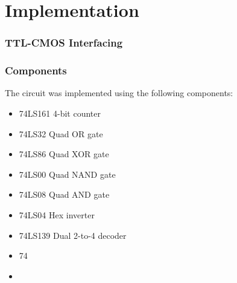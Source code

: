 \documentclass{article}
\begin{document}
        
    \section{Implementation}  
        \subsubsection{TTL-CMOS Interfacing}

        
    

        \subsubsection{Components}
        The circuit was implemented using the following components:
        \begin{itemize}
            \item 74LS161 4-bit counter
            \item 74LS32 Quad OR gate
            \item 74LS86 Quad XOR gate
            \item 74LS00 Quad NAND gate
            \item 74LS08 Quad AND gate
            \item 74LS04 Hex inverter
            \item 74LS139 Dual 2-to-4 decoder
            \item 74
            \item \\
        \end{itemize}
\end{document}
